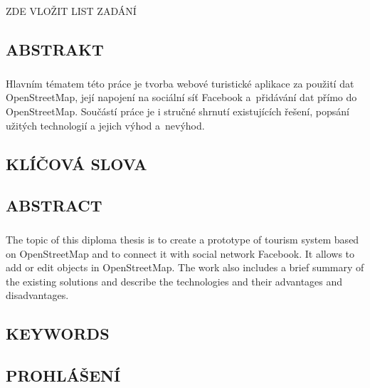 \documentclass[11pt,a4paper,titlepage,oneside]{book}
\begin{document}
\newpage %
	\begin{center}
		\vspace*{15cm}
		{\Large ZDE VLOŽIT LIST ZADÁNÍ}
	\end{center}

\begin{flushleft}
	\chapter*{}
	\section*{ABSTRAKT}
	\paragraph{} Hlavním tématem této práce je tvorba webové turistické aplikace za použití dat OpenStreetMap, její napojení na sociální síť Facebook a~přidávání dat přímo do OpenStreetMap. Součástí práce je i stručné shrnutí existujících řešení, popsání užitých technologií a jejich výhod a~nevýhod.
	\section*{KLÍČOVÁ SLOVA}
	{}
	\section*{ABSTRACT}
	\paragraph{} The topic of this diploma thesis is to create a prototype of tourism system based on OpenStreetMap and to connect it with social network Facebook. It allows to add or edit objects in OpenStreetMap. The work also includes a brief summary of the existing solutions and describe the technologies and their advantages and disadvantages.
	\section*{KEYWORDS}
	{}
\end{flushleft}

\newpage %
	\vspace*{15cm}
	\section*{\Large PROHLÁŠENÍ}
\end{document}
